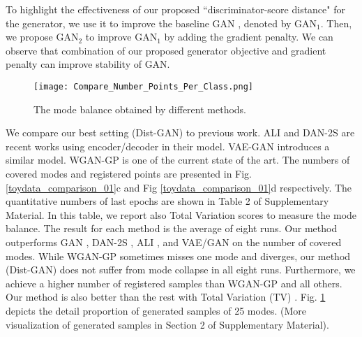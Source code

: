 \documentclass[runningheads]{llncs}
\begin{document}
To highlight the effectiveness of our proposed ``discriminator-score distance" for the generator, we use it to improve the baseline GAN \cite{goodfellow-nisp-2014}, denoted by GAN$_1$. Then, we propose GAN$_2$ to improve GAN$_1$ by adding the gradient penalty. We can observe that  combination of our proposed generator objective and gradient penalty can improve stability of  GAN.
\begin{figure}[t]
\centering
\texttt{[image: Compare\_Number\_Points\_Per\_Class.png]}
\caption{The mode balance obtained by different methods.}
\label{toydata_frequency}
\end{figure}
We compare our best setting (Dist-GAN) to previous work. ALI \cite{dumoulin-arxiv-2016} and DAN-2S \cite{li-arxiv-2017} are recent works using encoder/decoder in their model. VAE-GAN \cite{larsen-arxiv-2015} introduces a similar model. WGAN-GP \cite{gulrajani-arxiv-2017} is one of the current state of the art. The numbers of covered modes and registered points are presented in Fig. \ref{toydata_comparison_01}c and Fig \ref{toydata_comparison_01}d respectively. The quantitative numbers of last epochs are shown in Table 2 of Supplementary Material. In this table, we report also Total Variation scores to measure the mode balance. The result for each method is the average of eight runs. Our method outperforms GAN \cite{goodfellow-nisp-2014}, DAN-2S \cite{li-arxiv-2017}, ALI \cite{dumoulin-arxiv-2016}, and VAE/GAN \cite{larsen-arxiv-2015} on the number of covered modes. While WGAN-GP sometimes misses one mode and diverges, our method (Dist-GAN) does not suffer from  mode collapse in all eight runs. Furthermore, we achieve a higher number of registered samples than WGAN-GP and all others. Our method is also better than the rest with Total Variation (TV) \cite{li-arxiv-2017}. Fig. \ref{toydata_frequency} depicts the detail proportion of generated samples of 25 modes. (More visualization of generated samples in Section 2 of Supplementary Material).
\end{document}
